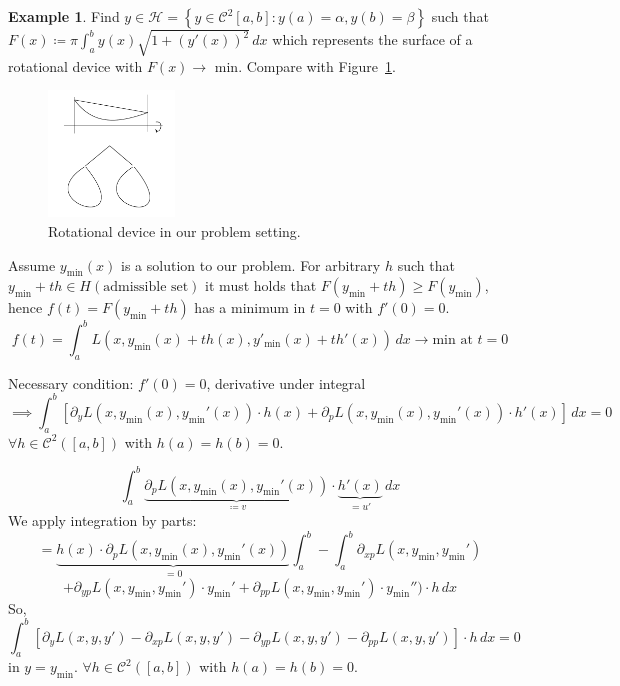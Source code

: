\documentclass[a4paper,landscape,twocolumn]{article}
\theoremstyle{definition}
\newtheorem{ex}{Example}
\newcommand\set[1]{\left\{#1\right\}}
\begin{document}
\begin{ex}
  Find $y \in \mathcal H = \set{y \in \mathcal C^2[a,b]: y(a) = \alpha, y(b) = \beta}$ such that $F(x) \coloneqq \pi \int_a^b y(x) \sqrt{1 + (y'(x))^2} \, dx$
  which represents the surface of a rotational device with
  $F(x) \to \text{ min}$. Compare with Figure~\ref{img:rot}.
\end{ex}

\begin{figure}[!h]
  \begin{center}
    \includegraphics[width=0.3\textwidth]{img/var_problem_setting.pdf}
    \caption{Rotational device in our problem setting.}
    \label{img:rot}
  \end{center}
\end{figure}

Assume $y_{\text{min}}(x)$ is a solution to our problem.
For arbitrary $h$ such that $y_{\text{min}} + th \in H(\text{admissible set})$
it must holds that $F(y_{\text{min}} + th) \geq F(y_{\text{min}})$,
hence $f(t) = F(y_{\text{min}} + th)$ has a minimum in $t=0$ with $f'(0) = 0$.
\[ f(t) = \int_a^b L(x, y_{\text{min}}(x) + th(x), y'_{\text{min}}(x) + th'(x)) \, dx \to \text{min} \text{ at } t=0 \]

Necessary condition:
$f'(0) = 0$, derivative under integral
\[ \implies \int_a^b \left[\partial_y L(x, y_{\text{min}}(x), y_{\text{min}}'(x)) \cdot h(x) + \partial_p L(x, y_{\text{min}}(x), y_{\text{min}}'(x)) \cdot h'(x) \right] \, dx = 0 \]
$\forall h \in \mathcal C^2([a,b])$ with $h(a) = h(b) = 0$.

\[ \int_a^b \underbrace{\partial_p L(x, y_{\text{min}}(x), y_{\text{min}}'(x))}_{\coloneqq v} \cdot \underbrace{h'(x)}_{=u'} \, dx \]
We apply integration by parts:
\[ = \underbrace{h(x) \cdot \partial_p L(x, y_{\text{min}}(x), y_{\text{min}}'(x))}_{=0} \int_a^b - \int_a^b \partial_{xp} L(x, y_{\min}, y_{\min}') \]
\[ + \partial_{yp} L(x, y_{\min}, y_{\min}') \cdot y_{\min}' + \partial_{pp} L(x, y_{\min}, y_{\min}') \cdot y_{\min}'') \cdot h \, dx \]
So,
\[ \int_a^b \left[ \partial_y L(x, y, y') - \partial_{xp} L(x, y, y') - \partial_{yp} L(x, y, y') - \partial_{pp} L(x, y, y') \right] \cdot h \, dx = 0 \]
in $y = y_{\min}$. $\forall h \in \mathcal C^2([a,b])$ with $h(a) = h(b) = 0$.
\end{document}
